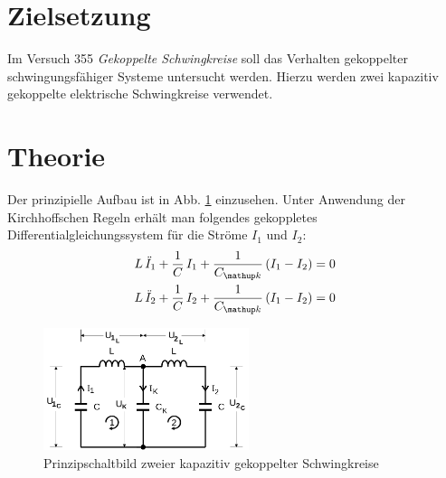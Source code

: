 \setcounter{page}{1}
\section*{Zielsetzung}
Im Versuch 355 \emph{Gekoppelte Schwingkreise} soll das Verhalten gekoppelter schwingungsfähiger Systeme untersucht werden. Hierzu
werden zwei kapazitiv gekoppelte elektrische Schwingkreise verwendet.
\section{Theorie}
Der prinzipielle Aufbau ist in Abb. \ref{fig: prinz_schwingkreis} einzusehen. Unter Anwendung der Kirchhoffschen Regeln erhält man folgendes gekoppletes
Differentialgleichungssystem für die Ströme $I_1$ und $I_2$:
\begin{align}
\begin{aligned}
L \, \ddot{I}_1 + \frac{1}{C} \, I_1 + \frac{1}{C\ua{k}} \left(I_1 - I_2 \right) &= 0 \\
L \, \ddot{I}_2 + \frac{1}{C} \, I_2 + \frac{1}{C\ua{k}} \left(I_1 - I_2 \right) &= 0 \\
\end{aligned}
\end{align}

\begin{figure}
  \centering
  \includegraphics[width = 6cm]{pics/prinzip_schwingkreis.png}
  \caption{Prinzipschaltbild zweier kapazitiv gekoppelter Schwingkreise \cite{anleitung355}}
  \label{fig: prinz_schwingkreis}
\end{figure}

